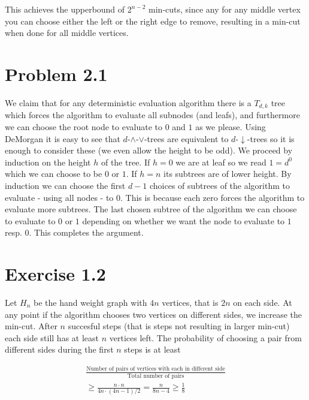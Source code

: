 This achieves the upperbound of $2^{n-2}$ min-cuts, since any for any middle vertex you can choose either the left or the right edge to remove, resulting in a min-cut when done for all middle vertices.

\section*{Problem 2.1}

We claim that for any deterministic evaluation algorithm there is a $T_{d,k}$ tree which forces the algorithm to evaluate all subnodes (and leafs), and furthermore we can choose the root node to evaluate to $0$ and $1$ as we please.
Using DeMorgan it is easy to see that $d$-$\land$-$\lor$-trees are equivalent to $d$-$\downarrow$-trees so it is enough to consider these (we even allow the height to be odd).
We proceed by induction on the height $h$ of the tree. 
If $h = 0$ we are at leaf so we read $1 = d^0$ which we can choose to be $0$ or $1$.
If $h = n$ its subtrees are of lower height. 
By induction we can choose the first $d-1$ choices of subtrees of the algorithm to evaluate - using all nodes - to 0.
This is because each zero forces the algorithm to evaluate more subtrees.
The last chosen subtree of the algorithm we can choose to evaluate to $0$ or $1$ depending on whether we want the node to evaluate to $1$ resp. $0$.
This completes the argument.

\section*{Exercise 1.2}

Let $H_n$ be the hand weight graph with $4n$ vertices, that is $2n$ on each side.
At any point if the algorithm chooses two vertices on different sides, we increase the min-cut. 
After $n$ succesful steps (that is steps not resulting in larger min-cut) each side still has at least $n$ vertices left. The probability of choosing a pair from different sides during the first $n$ steps is at least

\begin{align*}
	\frac{\text{Number of pairs of vertices with each in different side}}
	{\text{Total number of pairs}}
	\\ \geq \frac{ n \cdot n }
	{4n \cdot (4n - 1) / 2}
	= \frac{n}{8n - 4}
	\geq \frac{1}{8}
\end{align*}



